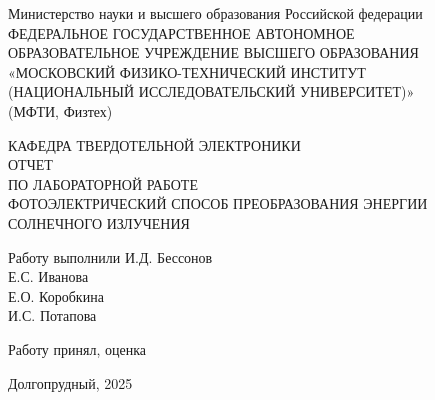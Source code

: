 \documentclass[a4paper, 12pt]{article}
\begin{document}
\begin{titlepage}
    \newpage
    \begin{center}
     Министерство науки и высшего образования Российской федерации \\ ФЕДЕРАЛЬНОЕ ГОСУДАРСТВЕННОЕ АВТОНОМНОЕ \\ ОБРАЗОВАТЕЛЬНОЕ УЧРЕЖДЕНИЕ ВЫСШЕГО ОБРАЗОВАНИЯ \\ «МОСКОВСКИЙ ФИЗИКО-ТЕХНИЧЕСКИЙ ИНСТИТУТ \\ (НАЦИОНАЛЬНЫЙ ИССЛЕДОВАТЕЛЬСКИЙ УНИВЕРСИТЕТ)» \\ (МФТИ, Физтех)
    \end{center}
    
    \vspace{15em}
    
    \begin{center}
    КАФЕДРА ТВЕРДОТЕЛЬНОЙ ЭЛЕКТРОНИКИ \\
    \vspace{1em}
    ОТЧЕТ\\
    ПО ЛАБОРАТОРНОЙ РАБОТЕ \\
    \vspace{1em}
    ФОТОЭЛЕКТРИЧЕСКИЙ СПОСОБ ПРЕОБРАЗОВАНИЯ ЭНЕРГИИ \\ СОЛНЕЧНОГО ИЗЛУЧЕНИЯ
    \end{center}

    \vspace{10em}
    \begin{flushleft}
        Работу выполнили \hspace{17em} \underline{\hspace{3cm}}
        И.Д. Бессонов \\
         \hspace{26em} \underline{\hspace{3cm}} Е.С. Иванова \\
          \hspace{26em} \underline{\hspace{2.6cm}} Е.О. Коробкина\\
        \hspace{26em}
        И.С. Потапова
    \end{flushleft}

    \vspace{1em}

    \begin{flushleft}
        Работу принял, оценка
        \hspace{15em}
    \end{flushleft}

    \vspace{5em}
    
    \begin{center}
        Долгопрудный, 2025
    \end{center}
\end{titlepage}
\end{document}
